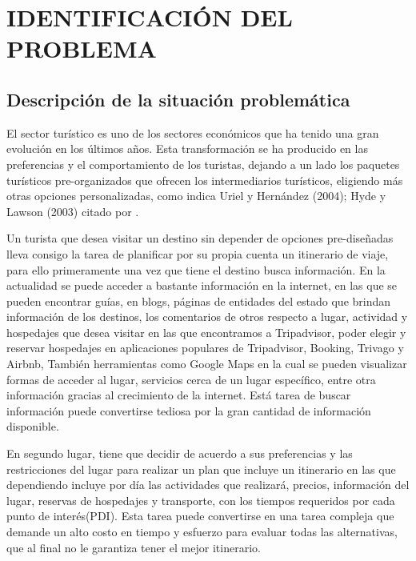 \chapter{IDENTIFICACIÓN DEL PROBLEMA }
\section{Descripción de la situación problemática}
El sector turístico es uno de los sectores económicos que ha tenido una gran evolución en los últimos años. Esta transformación se ha producido en las preferencias y el comportamiento de los turistas, dejando a un lado los paquetes turísticos pre-organizados que ofrecen los intermediarios turísticos, eligiendo más otras opciones personalizadas, como indica Uriel y Hernández (2004); Hyde y Lawson (2003) citado por .

Un turista que desea visitar un destino sin depender de opciones pre-diseñadas lleva consigo la tarea de planificar por su propia cuenta un itinerario de viaje, para ello primeramente una vez que tiene el destino busca información. En la actualidad se puede acceder a bastante información en la internet, en las que se pueden encontrar guías, en blogs, páginas de entidades del estado que brindan información de los destinos, los comentarios de otros respecto a lugar, actividad y hospedajes que desea visitar en las que encontramos a Tripadvisor, poder elegir y reservar hospedajes en aplicaciones populares de Tripadvisor, Booking, Trivago y Airbnb, También herramientas como Google Maps en la cual se pueden visualizar formas de acceder al lugar, servicios cerca de un lugar específico, entre otra información gracias al crecimiento de la internet. Está tarea de buscar información puede convertirse tediosa por la gran cantidad de información disponible.

En segundo lugar, tiene que decidir de acuerdo a sus preferencias y las restricciones del lugar para realizar un plan que incluye un itinerario en las que dependiendo incluye por día las actividades que realizará, precios, información del lugar, reservas de hospedajes y transporte, con los tiempos requeridos por cada punto de interés(PDI). Esta tarea puede convertirse en una tarea compleja que demande un alto costo en tiempo y esfuerzo para evaluar todas las alternativas, que al final no le garantiza tener el mejor itinerario.

